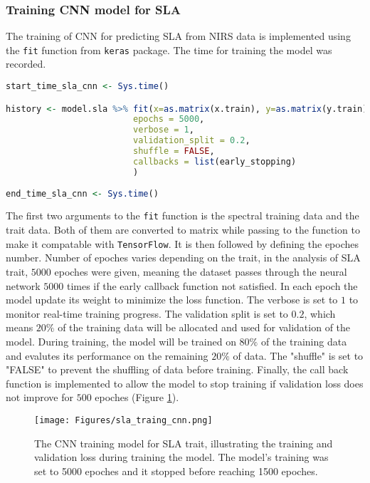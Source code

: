 \documentclass[12pt,a4paper]{report}
\begin{document}
\subsubsection*{Training CNN model for SLA}
The training of CNN for predicting SLA from NIRS data is implemented using the \texttt{fit} function from \texttt{keras} package. The time for training the model was recorded. \\

\begin{lstlisting}[language=R, style=mystyle]
start_time_sla_cnn <- Sys.time()

history <- model.sla %>% fit(x=as.matrix(x.train), y=as.matrix(y.train),
                         epochs = 5000,
                         verbose = 1,
                         validation_split = 0.2,
                         shuffle = FALSE,
                         callbacks = list(early_stopping)
                         )
                         
end_time_sla_cnn <- Sys.time()
\end{lstlisting}

The first two arguments to the \texttt{fit} function is the spectral training data and the trait data. Both of them are converted to matrix while passing to the function to make it compatable with \texttt{TensorFlow}. It is then followed by defining the epoches number. Number of epoches varies depending on the trait, in the analysis of SLA trait, $5000$ epoches were given, meaning the dataset passes through the neural network $5000$ times if the early callback function not satisfied.  In each epoch the model update its weight to minimize the loss function. The verbose is set to $1$ to monitor real-time training progress. The validation split is set to $0.2$, which means $20\%$ of the training data will be allocated and used for validation of the model. During training, the model will be trained on $80\%$ of the training data and evalutes its performance on the remaining $20\%$ of data. The "shuffle" is set to "FALSE" to prevent the shuffling of data before training. Finally, the call back function is implemented to allow the model to stop training if validation loss does not improve for $500$ epoches (Figure \ref{fig:sla_traing_cnn}). \\

\begin{figure}[h]
    \centering
    \texttt{[image: Figures/sla\_traing\_cnn.png]}
    \caption{The CNN training model for SLA trait, illustrating the training and validation loss during training the model. The model's training was set to 5000 epoches and it stopped before reaching 1500 epoches.}
    \label{fig:sla_traing_cnn}
\end{figure}
\end{document}
